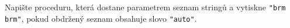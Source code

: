 \question[30]
Napište proceduru, která dostane parametrem seznam stringů a vytiskne
\texttt{"brm brm"}, pokud obdržený seznam obsahuje slovo \texttt{"auto"}.